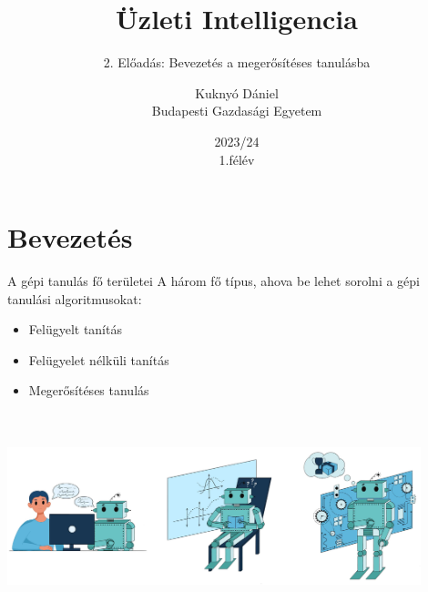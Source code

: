 \documentclass[english, aspectratio=169]{beamer}
\makeatletter
\newcommand\makebeamertitle{\frame{\maketitle}}
\let\origtableofcontents=\tableofcontents
\def\tableofcontents{\@ifnextchar[{\origtableofcontents}{\gobbletableofcontents}}
\def\gobbletableofcontents#1{\origtableofcontents}
\makeatother
\begin{document}
\section{Bevezetés}
\title[]{Üzleti Intelligencia}
\subtitle{2. Előadás: Bevezetés a megerősítéses tanulásba}
\author[Kuknyó Dániel]{Kuknyó Dániel\\Budapesti Gazdasági Egyetem}
\date{2023/24\\1.félév}
\makebeamertitle

\begin{frame}
\tableofcontents{}
\end{frame}

\begin{frame}
\tableofcontents[currentsection]
\end{frame}

\begin{frame}{A gépi tanulás fő területei}
A három fő típus, ahova be lehet sorolni a gépi tanulási algoritmusokat:
\begin{itemize}
	\item Felügyelt tanítás
	\item Felügyelet nélküli tanítás
	\item Megerősítéses tanulás
\end{itemize}
\begin{center}
\includegraphics[height=6cm, width=12cm, keepaspectratio]{images/reinf_21.png}
\end{center}
\end{frame}
\end{document}
